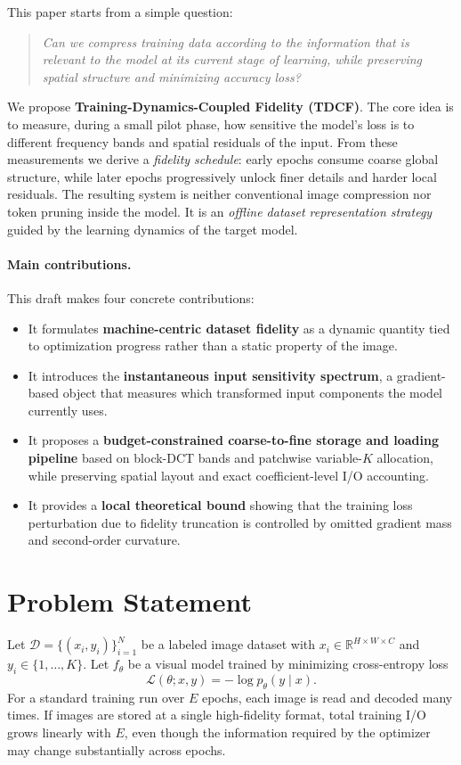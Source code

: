 \documentclass[10pt,twocolumn]{article}
\newcommand{\R}{\mathbb{R}}
\newcommand{\D}{\mathcal{D}}
\newcommand{\Lagr}{\mathcal{L}}
\begin{document}
This paper starts from a simple question:
\begin{quote}
\emph{Can we compress training data according to the information that is relevant to the model at its current stage of learning, while preserving spatial structure and minimizing accuracy loss?}
\end{quote}

We propose \textbf{Training-Dynamics-Coupled Fidelity (TDCF)}. The core idea is to measure, during a small pilot phase, how sensitive the model's loss is to different frequency bands and spatial residuals of the input. From these measurements we derive a \emph{fidelity schedule}: early epochs consume coarse global structure, while later epochs progressively unlock finer details and harder local residuals. The resulting system is neither conventional image compression nor token pruning inside the model. It is an \emph{offline dataset representation strategy} guided by the learning dynamics of the target model.

\paragraph{Main contributions.}
This draft makes four concrete contributions:
\begin{itemize}
    \item It formulates \textbf{machine-centric dataset fidelity} as a dynamic quantity tied to optimization progress rather than a static property of the image.
    \item It introduces the \textbf{instantaneous input sensitivity spectrum}, a gradient-based object that measures which transformed input components the model currently uses.
    \item It proposes a \textbf{budget-constrained coarse-to-fine storage and loading pipeline} based on block-DCT bands and patchwise variable-$K$ allocation, while preserving spatial layout and exact coefficient-level I/O accounting.
    \item It provides a \textbf{local theoretical bound} showing that the training loss perturbation due to fidelity truncation is controlled by omitted gradient mass and second-order curvature.
\end{itemize}

\section{Problem Statement}
Let $\D = \{(x_i, y_i)\}_{i=1}^N$ be a labeled image dataset with $x_i \in \R^{H \times W \times C}$ and $y_i \in \{1, \dots, K\}$. Let $f_\theta$ be a visual model trained by minimizing cross-entropy loss
\begin{equation}
    \Lagr(\theta; x, y) = -\log p_\theta(y \mid x).
\end{equation}
For a standard training run over $E$ epochs, each image is read and decoded many times. If images are stored at a single high-fidelity format, total training I/O grows linearly with $E$, even though the information required by the optimizer may change substantially across epochs.
\end{document}
